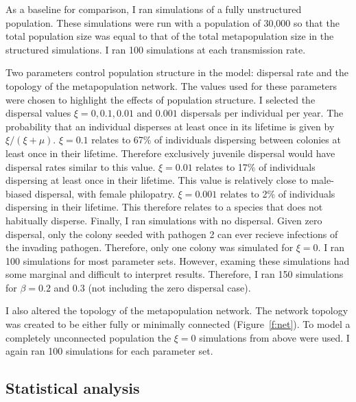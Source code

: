 As a baseline for comparison, I ran simulations of a fully unstructured population.
These simulations were run with a population of 30,000 so that the total population size was equal to that of the total metapopulation size in the structured simulations.
I ran 100 simulations at each transmission rate.




Two parameters control population structure in the model: dispersal rate and the topology of the metapopulation network.
The values used for these parameters were chosen to highlight the effects of population structure. 
I selected the dispersal values $\xi = 0, 0.1, 0.01$ and $ 0.001$ dispersals per individual per year. 
The probability that an individual disperses at least once in its lifetime is given by $\xi / \left(\xi + \mu\right)$.
$\xi = 0.1$ relates to 67\% of individuals dispersing between colonies at least once in their lifetime. 
Therefore exclusively juvenile dispersal would have dispersal rates similar to this value. %
$\xi = 0.01$ relates to 17\% of individuals dispersing at least once in their lifetime.
This value is relatively close to male-biased dispersal, with female philopatry. %
$\xi = 0.001$ relates to 2\% of individuals dispersing in their lifetime.
This therefore relates to a species that does not habitually disperse.
Finally, I ran simulations with no dispersal.
Given zero dispersal, only the colony seeded with pathogen 2 can ever recieve infections of the invading pathogen.
Therefore, only one colony was simulated for $\xi = 0$.
I ran 100 simulations for most parameter sets.
However, examing these simulations had some marginal and difficult to interpret results.
Therefore, I ran 150 simulations for $\beta = 0.2$ and $0.3$ (not including the zero dispersal case).



I also altered the topology of the metapopulation network.
The network topology was created to be either fully or minimally connected (Figure~\ref{f:net}). 
To model a completely unconnected population the $\xi = 0$ simulations from above were used.
I again ran 100 simulations for each parameter set.



\subsection{Statistical analysis}

